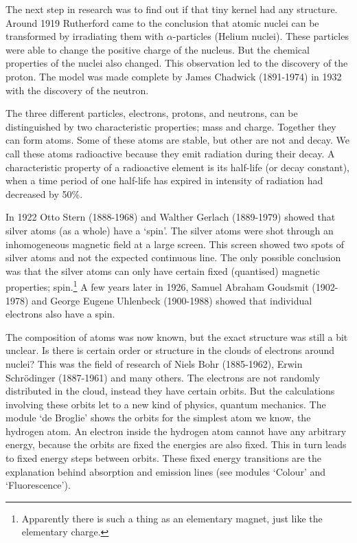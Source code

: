 \documentclass[12pt,a4paper]{article}
\numberwithin{equation}{section}
\numberwithin{figure}{section}
\numberwithin{table}{section}
\begin{document}
The next step in research was to find out if that tiny kernel had any structure. Around 1919 Rutherford came to the conclusion that atomic nuclei can be transformed by irradiating them with $\alpha$-particles (Helium nuclei). These particles were able to change the positive charge of the nucleus. But the chemical properties of the nuclei also changed. This observation led to the discovery of the proton. The model was made complete by James Chadwick (1891-1974) in 1932 with the discovery of the neutron.

The three different particles, electrons, protons, and neutrons, can be distinguished by two characteristic properties; mass and charge. Together they can form atoms. Some of these atoms are stable, but other are not and decay. We call these atoms radioactive because they emit radiation during their decay. A characteristic property of a radioactive element is its half-life (or decay constant), when a time period of one half-life has expired in intensity of radiation had decreased by 50\%.

In 1922 Otto Stern (1888-1968) and Walther Gerlach (1889-1979) showed that silver atoms (as a whole) have a `spin'. The silver atoms were shot through an inhomogeneous magnetic field at a large screen. This screen showed two spots of silver atoms and not the expected continuous line. The only possible conclusion was that the silver atoms can only have certain fixed (quantised) magnetic properties; spin.\footnote{Apparently there is such a thing as an elementary magnet, just like the elementary charge.} A few years later in 1926, Samuel Abraham Goudsmit (1902-1978) and George Eugene Uhlenbeck (1900-1988) showed that individual electrons also have a spin.

The composition of atoms was now known, but the exact structure was still a bit unclear. Is there is certain order or structure in the clouds of electrons around nuclei? This was the field of research of Niels Bohr (1885-1962), Erwin Schr\"odinger (1887-1961) and many others. The electrons are not randomly distributed in the cloud, instead they have certain orbits. But the calculations involving these orbits let to a new kind of physics, quantum mechanics. The module `de Broglie' shows the orbits for the simplest atom we know, the hydrogen atom. An electron inside the hydrogen atom cannot have any arbitrary energy, because the orbits are fixed the energies are also fixed. This in turn leads to fixed energy steps between orbits. These fixed energy transitions are the explanation behind absorption and emission lines (see modules `Colour' and `Fluorescence').
\end{document}

